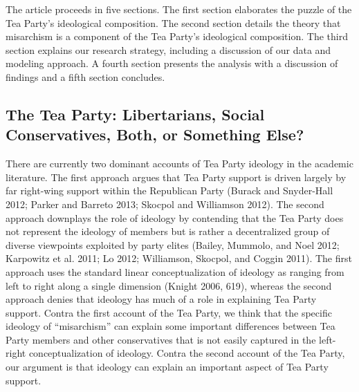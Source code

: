 \documentclass[12pt,]{article}
\begin{document}
The article proceeds in five sections. The first section elaborates the
puzzle of the Tea Party's ideological composition. The second section
details the theory that misarchism is a component of the Tea Party's
ideological composition. The third section explains our research
strategy, including a discussion of our data and modeling approach. A
fourth section presents the analysis with a discussion of findings and a
fifth section concludes.

\subsection{The Tea Party: Libertarians, Social Conservatives, Both, or
Something
Else?}\label{the-tea-party-libertarians-social-conservatives-both-or-something-else}

There are currently two dominant accounts of Tea Party ideology in the
academic literature. The first approach argues that Tea Party support is
driven largely by far right-wing support within the Republican Party
(Burack and Snyder-Hall 2012; Parker and Barreto 2013; Skocpol and
Williamson 2012). The second approach downplays the role of ideology by
contending that the Tea Party does not represent the ideology of members
but is rather a decentralized group of diverse viewpoints exploited by
party elites (Bailey, Mummolo, and Noel 2012; Karpowitz et al. 2011; Lo
2012; Williamson, Skocpol, and Coggin 2011). The first approach uses the
standard linear conceptualization of ideology as ranging from left to
right along a single dimension (Knight 2006, 619), whereas the second
approach denies that ideology has much of a role in explaining Tea Party
support. Contra the first account of the Tea Party, we think that the
specific ideology of ``misarchism'' can explain some important
differences between Tea Party members and other conservatives that is
not easily captured in the left-right conceptualization of ideology.
Contra the second account of the Tea Party, our argument is that
ideology can explain an important aspect of Tea Party support.
\end{document}
